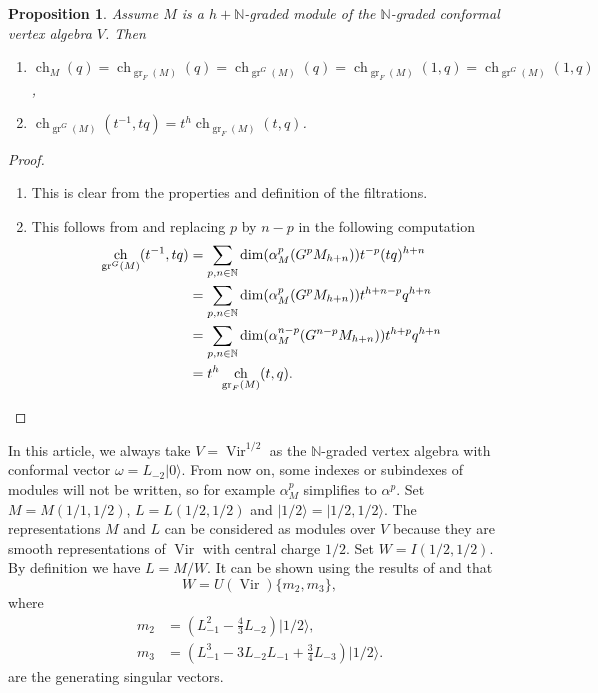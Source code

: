 \documentclass[12pt, a4paper]{article}
\newtheorem{proposition}{Proposition}
\DeclareMathOperator{\Vir}{Vir}
\DeclareMathOperator{\gr}{gr}
\DeclareMathOperator{\ch}{ch}
\newcommand{\vac}{|0\rangle}
\newcommand{\vachalf}{|1/2\rangle}
\begin{document}
\begin{proposition}
  \label{prp:5}
  Assume $M$ is a $h + \mathbb{N}$-graded module of the $\mathbb{N}$-graded conformal vertex algebra $V$.
  Then
  \begin{enumerate}[label={(\alph*)}]
  \item $\ch_M(q) = \ch_{\gr_F(M)}(q) = \ch_{\gr^G(M)}(q) = \ch_{\gr_F(M)}(1, q) = \ch_{\gr^G(M)}(1, q)$,
  \item $\ch_{\gr^G(M)}(t^{-1}, tq) = t^h\ch_{\gr_F(M)}(t, q)$.
  \end{enumerate}
\end{proposition}

\begin{proof}
  \begin{enumerate}[label={(\alph*)}]
  \item This is clear from the properties and definition of the filtrations.
  \item This follows from  and replacing $p$ by $n - p$ in the following computation
    \begin{align*}
    \ch_{\gr^G(M)}(t^{-1}, tq) &= \sum_{p, n \in \mathbb{N}}\dim(\alpha^p_M(G^pM_{h + n}))t^{-p}(tq)^{h+n} \\
    &= \sum_{p, n \in \mathbb{N}}\dim(\alpha^p_M(G^pM_{h + n}))t^{h + n - p}q^{h + n} \\
    &= \sum_{p, n \in \mathbb{N}}\dim(\alpha^{n - p}_M(G^{n - p}M_{h + n}))t^{h + p}q^{h + n} \\
    &= t^h\ch_{\gr_F(M)}(t, q).\qedhere
    \end{align*}
  \end{enumerate}
\end{proof}

In this article, we always take $V=\Vir^{1/2}$ as the $\mathbb{N}$-graded vertex algebra with conformal vector $\omega = L_{-2}\vac$.
From now on, some indexes or subindexes of modules will not be written, so for example $\alpha^p_M$ simplifies to $\alpha^p$.
Set $M = M(1/1, 1/2)$, $L = L(1/2, 1/2)$ and $\vachalf = |1/2, 1/2\rangle$.
The representations $M$ and $L$ can be considered as modules over $V$ because they are smooth representations of $\Vir$ with central charge $1/2$.
Set $W = I(1/2, 1/2)$.
By definition we have $L = M/W$.
It can be shown using the results of \cite{feigin_verma_1984} and \cite{astashkevich_structure_1997} that
\begin{equation*}
  W = U(\Vir)\{m_2, m_3\},
\end{equation*}
where
\begin{align*}
  m_2 &= \left(L_{-1}^2 - \tfrac{4}{3}L_{-2}\right)\vachalf, \\
  m_3 &= \left(L_{-1}^3 - 3L_{-2}L_{-1} + \tfrac{3}{4}L_{-3}\right)\vachalf.
\end{align*}
are the generating singular vectors.
\end{document}
